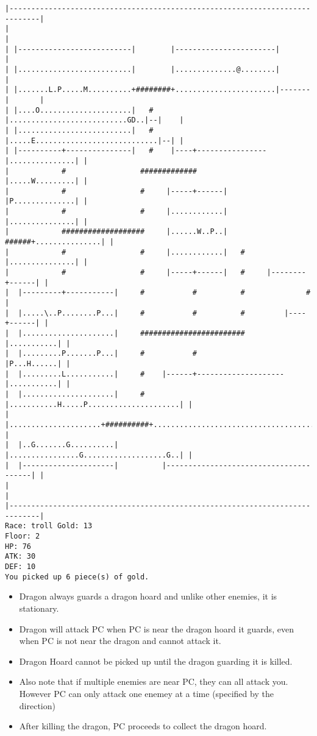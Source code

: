 \documentclass[11pt]{article}
\theoremstyle{plain}
\begin{document}
\begin{Verbatim}[fontsize=\small]
|-----------------------------------------------------------------------------|
|                                                                             |
| |--------------------------|        |-----------------------|               |
| |..........................|        |..............@........|               |
| |.......L.P.....M..........+########+.......................|-------|       |
| |....O.....................|   #    |...........................GD..|--|    |
| |..........................|   #    |.....E............................|--| |
| |----------+---------------|   #    |----+----------------|...............| |
|            #                 #############                |.....W.........| |
|            #                 #     |-----+------|         |P..............| |
|            #                 #     |............|         |...............| |
|            ###################     |......W..P..|   ######+...............| |
|            #                 #     |............|   #     |...............| |
|            #                 #     |-----+------|   #     |--------+------| |
|  |---------+-----------|     #           #          #              #        |
|  |.....\..P........P...|     #           #          #         |----+------| |
|  |.....................|     ########################         |...........| |
|  |.........P.......P...|     #           #                    |P...H......| |
|  |.........L...........|     #    |------+--------------------|...........| |
|  |.....................|     #    |...........H.....P.....................| |
|  |.....................+##########+.......................................| |
|  |..G.......G..........|          |................G...................G..| |
|  |---------------------|          |---------------------------------------| |
|                                                                             |
|-----------------------------------------------------------------------------|
Race: troll Gold: 13                                                   Floor: 2
HP: 76
ATK: 30
DEF: 10
You picked up 6 piece(s) of gold. 
\end{Verbatim}


\begin{itemize}
    \item Dragon always guards a dragon hoard and unlike other enemies, it is stationary.
    \item Dragon will attack PC when PC is near the dragon hoard it guards, even when PC
    is not near the dragon and cannot attack it.
    \item Dragon Hoard cannot be picked up until the dragon guarding it is killed.
    \item Also note that if multiple enemies are near PC, they can all attack you. However
    PC can only attack one enemey at a time (specified by the direction)
    \item After killing the dragon, PC proceeds to collect the dragon hoard.
\end{itemize}
\end{document}
